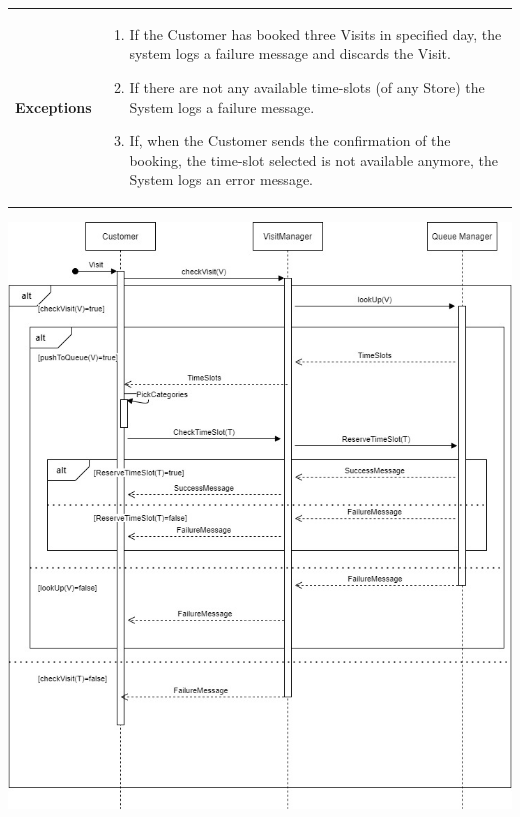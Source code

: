 \documentclass[a4paper, 12pt, oneside]{article}
\begin{document}
\begin{enumerate}[labelindent=20pt, label={UC.\arabic*}, itemindent=1em,leftmargin=!]
\begin{tabularx}{\linewidth}{| l | X |}
    \hline
    \textbf{Exceptions} & \parbox{0.7\textwidth}{ \begin{enumerate}
            \item If the Customer has booked three Visits in specified day, the system logs a failure message and discards the Visit.
            \item If there are not any available time-slots (of any Store) the System logs a failure message.
            \item If, when the Customer sends the confirmation of the booking, the time-slot selected is not available anymore, the System logs an error message.
        \end{enumerate}}\\

    \hline
    
\end{tabularx}

\begin{minipage}{\linewidth}
            \centering
           \includegraphics[height=0.5\textheight, scale=1, keepaspectratio]{img/seq_diag/GetVisitD.jpg}
\end{minipage}


\end{enumerate}
\end{document}
